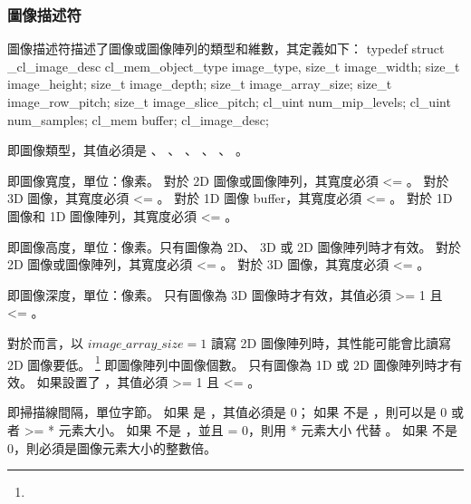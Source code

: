 \subsubsection[sec:imgDsc]{圖像描述符}

圖像描述符描述了圖像或圖像陣列的類型和維數，其定義如下：
\startclc
typedef struct _cl_image_desc {
	cl_mem_object_type	image_type,
	size_t			image_width;
	size_t			image_height;
	size_t			image_depth;
	size_t			image_array_size;
	size_t			image_row_pitch;
	size_t			image_slice_pitch;
	cl_uint			num_mip_levels;
	cl_uint			num_samples;
	cl_mem			buffer;
} cl_image_desc;
\stopclc

 即圖像類型，其值必須是 、
 、 、
 、 、
 。

 即圖像寬度，單位：像素。
對於 2D 圖像或圖像陣列，其寬度必須 <= 。
對於 3D 圖像，其寬度必須 <= 。
對於 1D 圖像 buffer，其寬度必須 <= 。
對於 1D 圖像和 1D 圖像陣列，其寬度必須 <= 。

 即圖像高度，單位：像素。只有圖像為 2D、 3D 或 2D 圖像陣列時才有效。
對於 2D 圖像或圖像陣列，其寬度必須 <= 。
對於 3D 圖像，其寬度必須 <= 。

 即圖像深度，單位：像素。
只有圖像為 3D 圖像時才有效，其值必須 >= 1 且 <= 。

\startbuffer[footnoteimagearraysize]
對於而言，以 $image\_array\_size = 1$ 讀寫 2D 圖像陣列時，其性能可能會比讀寫 2D 圖像要低。
\stopbuffer
{}\footnote{\getbuffer[footnoteimagearraysize]} 即圖像陣列中圖像個數。
只有圖像為 1D 或 2D 圖像陣列時才有效。
如果設置了 ，其值必須 >= 1 且 <= 。

 即掃描線間隔，單位字節。
如果  是 ，其值必須是 0；
如果  不是 ，則可以是 0 或者 >=  * 元素大小。
如果  不是 ，並且  = 0，則用  * 元素大小 代替 。
如果  不是 0，則必須是圖像元素大小的整數倍。

